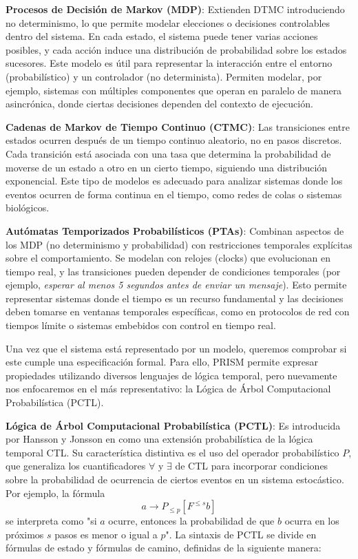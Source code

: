 \documentclass[runningheads]{llncs}
\begin{document}
\textbf{Procesos de Decisión de Markov (MDP)}: Extienden DTMC introduciendo no determinismo, lo que permite modelar elecciones o decisiones controlables dentro del sistema. En cada estado, el sistema puede tener varias acciones posibles, y cada acción induce una distribución de probabilidad sobre los estados sucesores. Este modelo es útil para representar la interacción entre el entorno (probabilístico) y un controlador (no determinista). Permiten modelar, por ejemplo, sistemas con múltiples componentes que operan en paralelo de manera asincrónica, donde ciertas decisiones dependen del contexto de ejecución.

\textbf{Cadenas de Markov de Tiempo Continuo (CTMC)}: Las transiciones entre estados ocurren después de un tiempo continuo aleatorio, no en pasos discretos. Cada transición está asociada con una tasa que determina la probabilidad de moverse de un estado a otro en un cierto tiempo, siguiendo una distribución exponencial. Este tipo de modelos es adecuado para analizar sistemas donde los eventos ocurren de forma continua en el tiempo, como redes de colas o sistemas biológicos.

\textbf{Autómatas Temporizados Probabilísticos (PTAs)}: Combinan aspectos de los MDP (no determinismo y probabilidad) con restricciones temporales explícitas sobre el comportamiento. Se modelan con relojes (clocks) que evolucionan en tiempo real, y las transiciones pueden depender de condiciones temporales (por ejemplo, \textit{esperar al menos 5 segundos antes de enviar un mensaje}). Esto permite representar sistemas donde el tiempo es un recurso fundamental y las decisiones deben tomarse en ventanas temporales específicas, como en protocolos de red con tiempos límite o sistemas embebidos con control en tiempo real.

Una vez que el sistema está representado por un modelo, queremos comprobar si este cumple una especificación formal. Para ello, PRISM permite expresar propiedades utilizando diversos lenguajes de lógica temporal, pero nuevamente nos enfocaremos en el más representativo: la Lógica de Árbol Computacional Probabilística (PCTL).

\textbf{Lógica de Árbol Computacional Probabilística (PCTL)}: Es introducida por Hansson y Jonsson en \cite{HH94} como una extensión probabilística de la lógica temporal CTL. Su característica distintiva es el uso del operador probabilístico $P$, que generaliza los cuantificadores $\forall$ y $\exists$ de CTL para incorporar condiciones sobre la probabilidad de ocurrencia de ciertos eventos en un sistema estocástico. Por ejemplo, la fórmula
\[a\to P_{\le p}[F^{\le s} b]\]
se interpreta como "si $a$ ocurre, entonces la probabilidad de que $b$ ocurra en los próximos $s$ pasos es menor o igual a $p$". La sintaxis de PCTL se divide en fórmulas de estado y fórmulas de camino, definidas de la siguiente manera:
\end{document}
